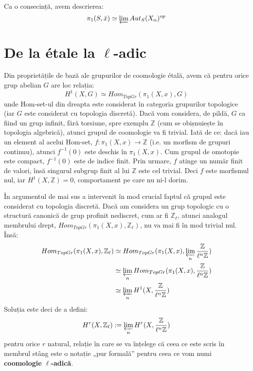 \documentclass[13pt,openany]{book}
\begin{document}
Ca o consecință, avem descrierea:
$$\pi_1(S,\bar{x}) \simeq \varprojlim Aut_S(X_\alpha)^{op}$$





\chapter{De la étale la \texorpdfstring{$\ell$}{l}-adic}

Din proprietățile de bază ale grupurilor de coomologie étală, avem că pentru orice grup abelian $G$ are loc relația:
$$H^1(X,G)\simeq Hom_{TopGr}(\pi_1(X,x),G)$$
unde Hom-set-ul din dreapta este considerat în categoria grupurilor topologice (iar $G$ este considerat cu topologia discretă). Dacă vom considera, de pildă, $G$ ca fiind un grup infinit, fără torsiune, spre exemplu $\mathbb{Z}$ (cum se obișnuiește în topologia algebrică), atunci grupul de coomologie va fi trivial. Iată de ce: dacă iau un element al acelui Hom-set, $f: \pi_1(X,x) \rightarrow \mathbb{Z}$ (i.e. un morfism de grupuri continuu), atunci $f^{-1}(0)$ este deschis în $\pi_1(X,x)$. Cum grupul de omotopie este compact, $f^{-1}(0)$ este de indice finit. Prin urmare, $f$ atinge un număr finit de valori, însă singurul subgrup finit al lui $\mathbb{Z}$ este cel trivial. Deci $f$ este morfismul nul, iar $H^1(X,\mathbb{Z})=0$, comportament pe care nu ni-l dorim.

În argumentul de mai sus a intervenit în mod crucial faptul că grupul este considerat cu topologia discretă. Dacă am considera un grup topologic cu o structură canonică de grup profinit nediscret, cum ar fi $\mathbb{Z}_\ell$, atunci analogul membrului drept, $Hom_{TopGr}(\pi_1(X,x),\mathbb{Z}_\ell)$, nu va mai fi în mod trivial nul. Însă:
\begin{align*}
Hom_{TopGr}(\pi_1(X,x),\mathbb{Z}_\ell)&\simeq Hom_{TopGr}(\pi_1(X,x),\varprojlim_n \frac{\mathbb{Z}}{\ell^n\mathbb{Z}}) \\
&\simeq \varprojlim_n Hom_{TopGr}(\pi_1(X,x), \frac{\mathbb{Z}}{\ell^n\mathbb{Z}}) \\
&\simeq \varprojlim_n H^1(X, \frac{\mathbb{Z}}{\ell^n\mathbb{Z}}) \\
\end{align*}
Soluția este deci de a defini:
$$H^r(X,\mathbb{Z}_\ell):=\varprojlim_n H^r(X, \frac{\mathbb{Z}}{\ell^n\mathbb{Z}})$$
pentru orice $r$ natural, relație în care se va înțelege că ceea ce este scris în membrul stâng este o notație „pur formală” pentru ceea ce vom numi {\bf coomologie $\ell$-adică}.
\end{document}

